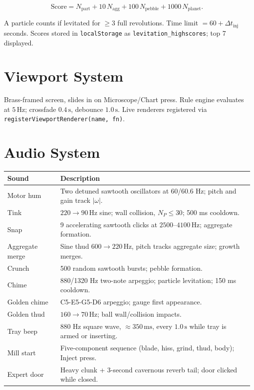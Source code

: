\documentclass[12pt, a4paper]{article}
\newcommand{\omg}{\omega}
\begin{document}
\begin{equation}
  \mathrm{Score} = N_{\mathrm{part}} + 10\,N_{\mathrm{agg}}
    + 100\,N_{\mathrm{pebble}} + 1000\,N_{\mathrm{planet}}.
\end{equation}

A particle counts if levitated for $\geq 3$ full revolutions. Time limit
$= 60 + \Delta t_{\mathrm{inj}}$ seconds. Scores stored in
\texttt{localStorage} as \texttt{levitation\_highscores}; top 7 displayed.

\section{Viewport System}
\label{sec:viewport}

Brass-framed screen, slides in on Microscope/Chart press. Rule engine
evaluates at $5\,\mathrm{Hz}$; crossfade $0.4\,\mathrm{s}$, debounce
$1.0\,\mathrm{s}$. Live renderers registered via
\texttt{registerViewportRenderer(name, fn)}.

\section{Audio System}

\begin{longtable}{@{}lp{11cm}@{}}
  \toprule
  Sound & Description \\
  \midrule
  Motor hum      & Two detuned sawtooth oscillators at 60/60.6 Hz; pitch and gain track $|\omg|$. \\
  Tink           & $220 \to 90\,\mathrm{Hz}$ sine; wall collision, $N_P \leq 30$; 500 ms cooldown. \\
  Snap           & 9 accelerating sawtooth clicks at $2500$--$4100\,\mathrm{Hz}$; aggregate formation. \\
  Aggregate merge & Sine thud $600 \to 220\,\mathrm{Hz}$, pitch tracks aggregate size; growth merges. \\
  Crunch         & 500 random sawtooth bursts; pebble formation. \\
  Chime          & 880/1320 Hz two-note arpeggio; particle levitation; 150 ms cooldown. \\
  Golden chime   & C5-E5-G5-D6 arpeggio; gauge first appearance. \\
  Golden thud    & $160 \to 70\,\mathrm{Hz}$; ball wall/collision impacts. \\
  Tray beep      & 880 Hz square wave, $\approx 350\,\mathrm{ms}$, every $1.0\,\mathrm{s}$
                   while tray is armed or inserting. \\
  Mill start     & Five-component sequence (blade, hiss, grind, thud, body); Inject press. \\
  Expert door    & Heavy clunk + 3-second cavernous reverb tail; door clicked while closed. \\
  \bottomrule
\end{longtable}
\end{document}
